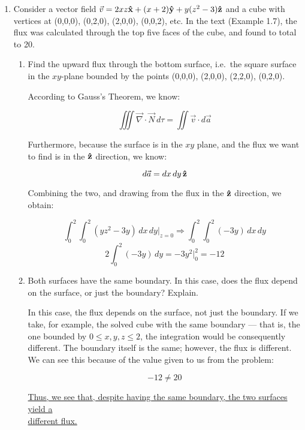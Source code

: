 \begin{enumerate}
\begin{enumerate}
    \end{enumerate}

  \item Consider a vector field $\vec{v}=2xz\bold{\hat{x}}+(x+2)\bold{\hat{y}}+y(z^2-3)\bold{\hat{z}}$ and a cube with vertices at (0,0,0), (0,2,0), (2,0,0), (0,0,2), etc. In the text (Example 1.7), the flux was calculated through the top five faces of the cube, and found to total to 20.

    \begin{enumerate}

      \item Find the upward flux through the bottom surface, i.e.\ the square surface in the $xy$-plane bounded by the points (0,0,0), (2,0,0), (2,2,0), (0,2,0).

        According to Gauss's Theorem, we know:

        $$\iiint \vec{\nabla}\cdot\vec{N}\,d\tau=\iint\vec{v}\cdot d\vec{a}$$

        Furthermore, because the surface is in the $xy$ plane, and the flux we want to find is in the $\bold{\hat{z}}$ direction, we know:

        $$d\vec{a}=dx\,dy\,\bold{\hat{z}}$$

        Combining the two, and drawing from the flux in the $\bold{\hat{z}}$ direction, we obtain:

        $$\int_0^2\int_0^2 (yz^2-3y)\,dx\,dy\Big|_{z=0}\Rightarrow\int_0^2\int_0^2 (-3y)\,dx\,dy$$
        $$\boxed{2\int_0^2 (-3y)\,dy=-3y^2\Big|_0^2=-12}$$

      \item Both surfaces have the same boundary. In this case, does the flux depend on the surface, or just the boundary? Explain.

        In this case, the flux depends on the surface, not just the boundary. If we take, for example, the solved cube with the same boundary — that is, the one bounded by $0\leq x,y,z\leq 2$, the integration would be consequently different. The boundary itself is the same; however, the flux is different. We can see this because of the value given to us from the problem:

        $$-12\neq20$$

      \underline{Thus, we see that, despite having the same boundary, the two surfaces yield a}\\\underline{ different flux.}

    \end{enumerate}


\end{enumerate}
